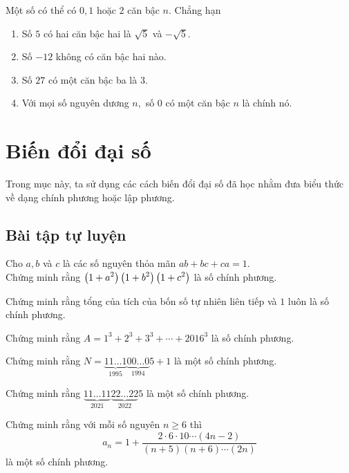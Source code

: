 Một số có thể có $0,1$ hoặc $2$ căn bậc $n.$ Chẳng hạn
\begin{enumerate}
    \item Số $5$ có hai căn bậc hai là $\sqrt{5}$ và $-\sqrt{5}.$
    \item Số $-12$ không có căn bậc hai nào.  
    \item Số $27$ có một căn bậc ba là $3.$
    \item Với mọi số nguyên dương $n,$ số $0$ có một căn bậc $n$ là chính nó.
\end{enumerate}

\section{Biến đổi đại số}

Trong mục này, ta sử dụng các cách biến đổi đại số đã học nhằm đưa biểu thức về dạng chính phương hoặc lập phương.

\subsection*{Bài tập tự luyện}

\begin{btt}
Cho $a,b$ và $c$ là các số nguyên thỏa mãn $ab + bc + ca = 1$. \\
Chứng minh rằng $\left(\displaystyle 1+a^2 \right)\left(\displaystyle 1+b^2 \right)\left(\displaystyle 1+c^2 \right)$ là số chính phương.
\end{btt}

\begin{btt}
Chứng minh rằng tổng của tích của bốn số tự nhiên liên tiếp và $1$ luôn là số chính phương.
\end{btt}

\begin{btt} \label{scp1.111}
Chứng minh rằng ${A}=1^{3}+2^{3}+3^{3}+\cdots+2016^{3}$ là số chính phương.
\end{btt}

\begin{btt}
Chứng minh rằng $N=\underbrace{11\ldots1}_{1995} \underbrace{00\ldots0}_{1994}5+1$ là một số chính phương.
\end{btt}

\begin{btt}
Chứng minh rằng $\underbrace {11\ldots11}_{2021}\underbrace {22\ldots22}_{2022}5$
là một số chính phương.
\end{btt}

\begin{btt} 
Chứng minh rằng với mỗi số nguyên $n \geq 6$ thì $$a_{{n}}=1+\dfrac{2\cdot6\cdot10 \cdots(4 n-2)}{(n+5)(n+6) \cdots(2 n)}$$ là một
số chính phương.
\end{btt}

